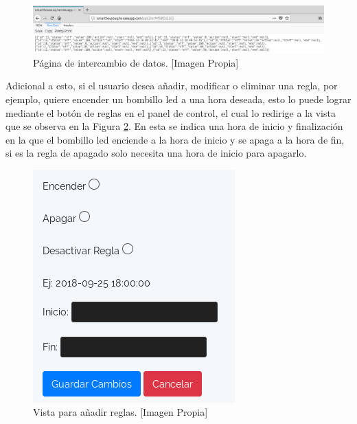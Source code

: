 \begin{figure}[H]
	\centering
	\caption[Página de intercambio de datos.]{Página de intercambio de datos. [Imagen Propia]}
	\label{fig:updateview}
	\includegraphics[width=\linewidth]{Imagenes/Update_view}
\end{figure}

Adicional a esto, si el usuario desea añadir, modificar o eliminar una regla, por ejemplo, quiere encender un bombillo led a una hora deseada, esto lo puede lograr mediante el botón de reglas en el panel de control, el cual lo redirige a la vista que se observa en la Figura \ref{fig:rulesview}. En esta se indica una hora de inicio y finalización en la que el bombillo led enciende a la hora de inicio y se apaga a la hora de fin, si es la regla de apagado solo necesita una hora de inicio para apagarlo.\\

\begin{figure}[H]
	\centering
	\caption[Vista para añadir reglas.]{Vista para añadir reglas. [Imagen Propia]}
	\label{fig:rulesview}
	\includegraphics[width=0.4\linewidth]{Imagenes/rules_view}
\end{figure}

%
%

